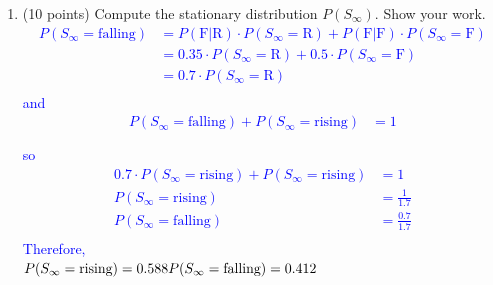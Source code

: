 \documentclass[12pt]{article}
\newenvironment{qparts}{\begin{enumerate}[{(}a{)}]}{\end{enumerate}}
\begin{document}
\begin{qparts}
  \item (10 points) Compute the stationary
  distribution $P(S_{\infty})$.  Show your
  work.
  \textcolor{blue}{
    \begin{align*}
      P(S_\infty=\mbox{falling}) & = P(\mbox{F}|\mbox{R}) \cdot P(S_\infty=\mbox{R}) + P(\mbox{F}|\mbox{F}) \cdot P(S_\infty=\mbox{F}) \\
                                 & = 0.35 \cdot P(S_\infty=\mbox{R}) + 0.5 \cdot P(S_\infty=\mbox{F})                                  \\
                                 & = 0.7 \cdot P(S_\infty=\mbox{R})                                                                    \\
    \end{align*}
    and
    \begin{align*}
      P(S_\infty=\mbox{falling}) + P(S_\infty=\mbox{rising}) & = 1 \\                                                             \\
    \end{align*}
    so
    \begin{align*}
      0.7 \cdot P(S_\infty=\mbox{rising}) + P(S_\infty=\mbox{rising}) & = 1               \\
      P(S_\infty=\mbox{rising})                                       & = \frac{1}{1.7}   \\
      P(S_\infty=\mbox{falling})                                      & = \frac{0.7}{1.7} \\
    \end{align*}
    Therefore,\\
    $P(S_\infty=\mbox{rising}) = 0.588\\P(S_\infty=\mbox{falling}) = 0.412$
  }

  \vspace{5em}


\end{qparts}

\newpage
\end{document}
